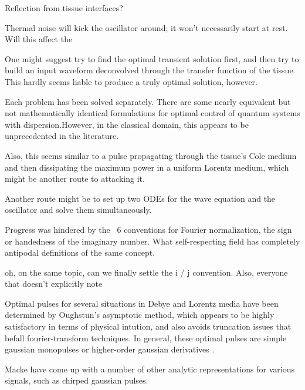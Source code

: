 \documentclass[paper.tex]{subfiles}
\begin{document}
\begin{autem}
Reflection from tissue interfaces?

Thermal noise will kick the oscillator around; it won't necessarily start at rest. Will this affect the 
\end{autem}

One might suggest try to find the optimal transient solution first, and then try to build an input waveform deconvolved through the  transfer function of the tissue. This hardly seems liable to produce a truly optimal solution, however.

Each problem has been solved separately. There are some nearly equivalent but not mathematically identical formulations for optimal control of quantum systems with dispersion.\footnotemark However, in the classical domain, this appears to be unprecedented in the literature.


Also, this seems similar to a pulse propagating through the tissue's Cole medium and then dissipating the maximum power in a uniform Lorentz medium, which might be another route to attacking it.

Another route might be to set up two ODEs for the wave equation and the oscillator and solve them simultaneously.

Progress was hindered by the ~6 conventions for Fourier normalization, the sign or handedness of the imaginary number. What self-respecting field has completely antipodal definitions of the same concept.

oh, on the same topic, can we finally settle the i / j convention. Also, everyone that doesn't explicitly note  

Optimal pulses for several situations in Debye and Lorentz media have been determined by Oughstun's asymptotic method, which appears to be highly satisfactory in terms of physical intution, and also avoids truncation issues that befall fourier-transform techniques. In general, these optimal pulses are simple gaussian monopulses or higher-order gaussian derivatives \cite{Optimal2017} \cite{Optimal2015}. 

Macke \cite{Simple2012} have come up with a number of other analytic representations for various signals, such as chirped gaussian pulses.
\end{document}
